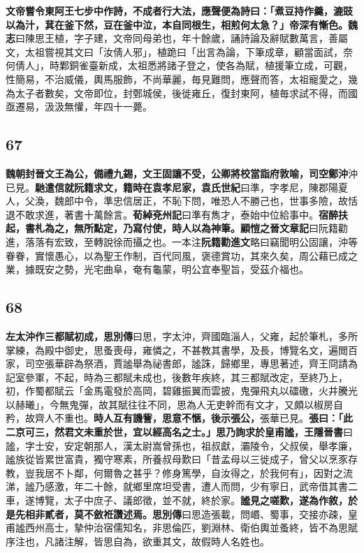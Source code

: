 \textbf{文帝嘗令東阿王七步中作詩，不成者行大法，應聲便為詩曰：「煮豆持作羹，漉豉以為汁，萁在釜下然，豆在釜中泣，本自同根生，相煎何太急？」帝深有慚色。}{\footnotesize \textbf{魏志}曰陳思王植，字子建，文帝同母弟也，年十餘歲，誦詩論及辭賦數萬言，善屬文，太祖嘗視其文曰「汝倩人邪」，植跪曰「出言為論，下筆成章，顧當面試，奈何倩人」，時鄴銅雀臺新成，太祖悉將諸子登之，使各為賦，植援筆立成，可觀，性簡易，不治威儀，輿馬服飾，不尚華麗，毎見難問，應聲而答，太祖寵愛之，幾為太子者數矣，文帝即位，封鄄城侯，後徙雍丘，復封東阿，植毎求試不得，而國亟遷易，汲汲無懽，年四十一薨。}

\subsection*{67}

\textbf{魏朝封晉文王為公，備禮九錫，文王固讓不受，公卿將校當詣府敦喻，司空鄭沖}{\footnotesize 沖已見。}\textbf{馳遣信就阮籍求文，籍時在袁孝尼家，}{\footnotesize \textbf{袁氏世紀}曰準，字孝尼，陳郡陽夏人，父渙，魏郎中令，準忠信居正，不恥下問，唯恐人不勝己也，世事多險，故恬退不敢求進，著書十萬餘言。\textbf{荀綽兗州記}曰準有雋才，泰始中位給事中。}\textbf{宿醉扶起，書札為之，無所點定，乃寫付使，時人以為神筆。}{\footnotesize \textbf{顧愷之晉文章記}曰阮籍勸進，落落有宏致，至轉說徐而攝之也。一本注\textbf{阮籍勸進文}略曰竊聞明公固讓，沖等眷眷，實懷愚心，以為聖王作制，百代同風，褒德賞功，其來久矣，周公藉已成之業，據既安之勢，光宅曲阜，奄有龜蒙，明公宜奉聖旨，受茲介福也。}

\subsection*{68}

\textbf{左太沖作三都賦初成，}{\footnotesize \textbf{思別傳}曰思，字太沖，齊國臨淄人，父雍，起於筆札，多所掌練，為殿中御史，思蚤喪母，雍憐之，不甚教其書學，及長，博覽名文，遍閲百家，司空張華辟為祭酒，賈謐舉為祕書郎，謐誅，歸鄉里，專思著述，齊王冏請為記室參軍，不起，時為三都賦未成也，後數年疾終，其三都賦改定，至終乃上，初，作蜀都賦云「金馬電發於高岡，碧雞振翼而雲披，鬼彈飛丸以礌礉，火井騰光以赫曦」，今無鬼彈，故其賦往往不同，思為人无吏幹而有文才，又頗以椒房自矜，故齊人不重也。}\textbf{時人互有譏訾，思意不愜，後示張公，}{\footnotesize 張華已見。}\textbf{張曰：「此二京可三，然君文未重於世，宜以經高名之士。」思乃詢求於皇甫謐，}{\footnotesize \textbf{王隱晉書}曰謐，字士安，安定朝那人，漢太尉嵩曾孫也，祖叔獻，灞陵令，父叔侯，舉孝廉，謐族從皆累世富貴，獨守寒素，所養叔母歎曰「昔孟母以三徙成子，曾父以烹豕存教，豈我居不卜鄰，何爾魯之甚乎？修身篤學，自汝得之，於我何有」，因對之流涕，謐乃感激，年二十餘，就鄉里席坦受書，遭人而問，少有寧日，武帝借其書二車，遂博覽，太子中庶子、議郎徵，並不就，終於家。}\textbf{謐見之嗟歎，遂為作敘，於是先相非貳者，莫不斂袵讚述焉。}{\footnotesize \textbf{思別傳}曰思造張載，問㟭、蜀事，交接亦疎，皇甫謐西州高士，摯仲治宿儒知名，非思倫匹，劉淵林、衛伯輿並蚤終，皆不為思賦序注也，凡諸注解，皆思自為，欲重其文，故假時人名姓也。}


